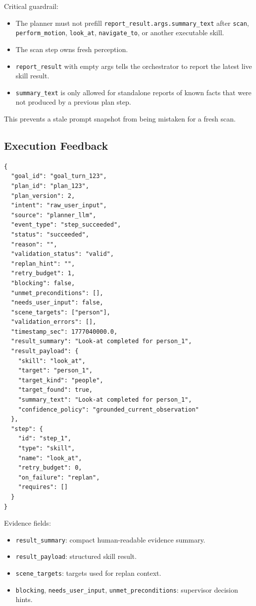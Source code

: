 \documentclass[12pt,a4paper]{article}
\newcommand{\code}[1]{\texttt{#1}}
\begin{document}
Critical guardrail:

\begin{itemize}
\item The planner must not prefill \code{report\_result.args.summary\_text} after \code{scan}, \code{perform\_motion}, \code{look\_at}, \code{navigate\_to}, or another executable skill.
\item The scan step owns fresh perception.
\item \code{report\_result} with empty args tells the orchestrator to report the latest live skill result.
\item \code{summary\_text} is only allowed for standalone reports of known facts that were not produced by a previous plan step.
\end{itemize}

This prevents a stale prompt snapshot from being mistaken for a fresh scan.



\subsection{Execution Feedback}

\begin{lstlisting}
{
  "goal_id": "goal_turn_123",
  "plan_id": "plan_123",
  "plan_version": 2,
  "intent": "raw_user_input",
  "source": "planner_llm",
  "event_type": "step_succeeded",
  "status": "succeeded",
  "reason": "",
  "validation_status": "valid",
  "replan_hint": "",
  "retry_budget": 1,
  "blocking": false,
  "unmet_preconditions": [],
  "needs_user_input": false,
  "scene_targets": ["person"],
  "validation_errors": [],
  "timestamp_sec": 1777040000.0,
  "result_summary": "Look-at completed for person_1",
  "result_payload": {
    "skill": "look_at",
    "target": "person_1",
    "target_kind": "people",
    "target_found": true,
    "summary_text": "Look-at completed for person_1",
    "confidence_policy": "grounded_current_observation"
  },
  "step": {
    "id": "step_1",
    "type": "skill",
    "name": "look_at",
    "retry_budget": 0,
    "on_failure": "replan",
    "requires": []
  }
}
\end{lstlisting}

Evidence fields:

\begin{itemize}
\item \code{result\_summary}: compact human-readable evidence summary.
\item \code{result\_payload}: structured skill result.
\item \code{scene\_targets}: targets used for replan context.
\item \code{blocking}, \code{needs\_user\_input}, \code{unmet\_preconditions}: supervisor decision hints.
\end{itemize}
\end{document}
